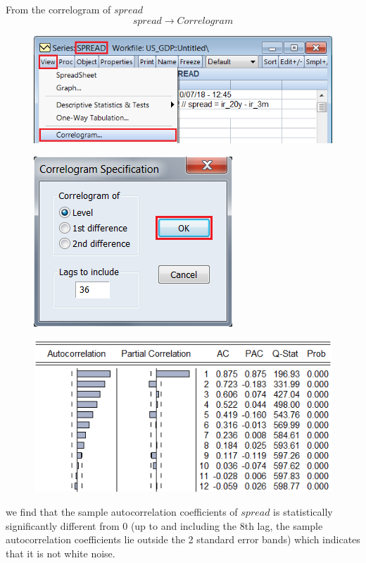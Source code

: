 \documentclass[12pt]{report}
\begin{document}
\noindent From the correlogram of $spread$ $$spread \to Correlogram$$ \begin{figure}[H]
	\centerline{\includegraphics{tute11_38}}
\end{figure}
\vspace{-\baselineskip} \begin{figure}[H]
	\centerline{\includegraphics{tute11_39}}
\end{figure}
\vspace{-\baselineskip} \begin{figure}[H]
	\centerline{\includegraphics{tute11_40}}
\end{figure}
\vspace{-\baselineskip} \noindent we find that the sample autocorrelation coefficients of $spread$ is statistically significantly different from 0 (up to and including the 8th lag, the sample autocorrelation coefficients lie outside the 2 standard error bands) which indicates that it is not white noise.
\end{document}

